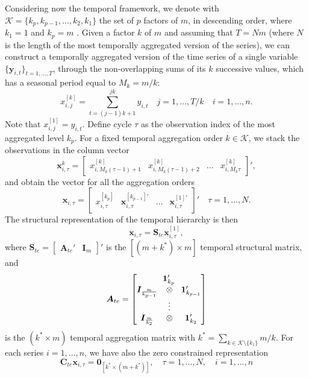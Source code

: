 \documentclass[a4paper,11pt]{article}
\newcommand{\Unovet}{\bm{1}}
\newcommand{\xvet}{\bm{x}}
\newcommand{\yvet}{\bm{y}}
\newcommand{\Avet}{\bm{A}}
\newcommand{\Cvet}{\bm{C}}
\newcommand{\Ivet}{\bm{I}}
\newcommand{\Svet}{\bm{S}}
\newcommand{\Zerovet}{\bm{0}}
\theoremstyle{definition}
\begin{document}
Considering now the temporal framework, we denote with $\mathcal{K} = \{ k_p , k_{p-1}, \dots, k_2, k_1 \}$ the set of $p$ factors of $m$, in descending order, where $k_1= 1$ and $k_p= m$ \citep{athanasopoulos2017}. Given a factor $k$ of $m$ and assuming that $T = N m$ (where $N$ is the length of the most temporally aggregated version of the series), we can construct a temporally aggregated version of the time series of a single variable $\{\yvet_{i,t}\}_{t = 1, ..., T}$, through the non-overlapping sums of its $k$ successive values, which has a seasonal period equal to $M_k= m/k$:
$$
x_{i,j}^{[k]} = \sum_{t=(j-1)k+1}^{jk} y_{i,t}\quad j = 1,..., T/k \quad i = 1,...,n.
$$
Note that $x_{i,j}^{[1]}=y_{i,t}$. Define cycle $\tau$ as the observation index of the most aggregated level $k_p$. For a fixed temporal aggregation order $k \in \mathcal{K}$, we stack the observations in the column vector 
$$
\xvet_{i,\tau}^{k} = \begin{bmatrix}x_{i,M_k(\tau-1)+1}^{[k]} & x_{i,M_k(\tau-1)+2}^{[k]} & \dots & x_{i,M_k\tau}^{[k]}\end{bmatrix}',
$$
and obtain the vector for all the aggregation orders 
$$
\xvet_{i,\tau} = \begin{bmatrix}
	x_{i,\tau}^{[k_p]} &
	\xvet_{i,\tau}^{[k_{p-1}]\prime} &
	\dots &
	\xvet_{i,\tau}^{[1]\prime}
\end{bmatrix}'\quad \tau = 1,...,N.
$$
The structural representation of the temporal hierarchy \citep{athanasopoulos2017} is then
$$
\xvet_{i,\tau} = \Svet_{te}\xvet_{i,\tau}^{[1]},
$$
where $\Svet_{te} = \begin{bmatrix}\Avet_{te}' & \Ivet_{m}\end{bmatrix}'$ is the $\left[(m+k^\ast) \times m\right]$ temporal structural matrix, and
$$
\Avet_{te} = \begin{bmatrix}
	\multicolumn{3}{c}{\Unovet_{k_p}'}\\
	\Ivet_{\frac{m}{k_{p-1}}} & \otimes & \Unovet_{k_{p-1}}'\\
	&\vdots &\\
	\Ivet_{\frac{m}{k_{2}}} & \otimes & \Unovet_{k_2}'
\end{bmatrix}
$$
is the $\left(k^\ast \times m\right)$ temporal aggregation matrix with $k^\ast = \sum_{k \in \mathcal{K}\setminus\{k_1\}} m/k$. For each series $i = 1,...,n$, we have also the zero constrained representation
\begin{equation}
\label{eq:te_con}
	\Cvet_{te}\xvet_{i,\tau} = \Zerovet_{\left[k^\ast \times (m+k^\ast)\right]}, \quad \tau = 1,...,N, \quad i = 1,..., n
\end{equation}
\end{document}
